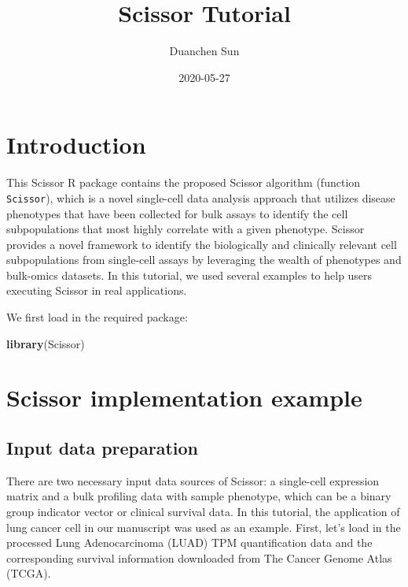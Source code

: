 \documentclass[]{article}
\title{Scissor Tutorial}
\author{Duanchen Sun}
\date{2020-05-27}
\newenvironment{Shaded}{\begin{snugshade}}{\end{snugshade}}
\newcommand{\KeywordTok}[1]{\textcolor[rgb]{0.13,0.29,0.53}{\textbf{#1}}}
\newcommand{\NormalTok}[1]{#1}
\begin{document}
\maketitle

{
\setcounter{tocdepth}{2}
\tableofcontents
}
\section{Introduction}\label{introduction}

This Scissor R package contains the proposed Scissor algorithm (function
\texttt{Scissor}), which is a novel single-cell data analysis approach
that utilizes disease phenotypes that have been collected for bulk
assays to identify the cell subpopulations that most highly correlate
with a given phenotype. Scissor provides a novel framework to identify
the biologically and clinically relevant cell subpopulations from
single-cell assays by leveraging the wealth of phenotypes and bulk-omics
datasets. In this tutorial, we used several examples to help users
executing Scissor in real applications.

We first load in the required package:

\begin{Shaded}
\begin{Highlighting}[]
\KeywordTok{library}\NormalTok{(Scissor)}
\end{Highlighting}
\end{Shaded}

\section{Scissor implementation
example}\label{scissor-implementation-example}

\subsection{Input data preparation}\label{input-data-preparation}

There are two necessary input data sources of Scissor: a single-cell
expression matrix and a bulk profiling data with sample phenotype, which
can be a binary group indicator vector or clinical survival data. In
this tutorial, the application of lung cancer cell in our manuscript was
used as an example. First, let's load in the processed Lung
Adenocarcinoma (LUAD) TPM quantification data and the corresponding
survival information downloaded from The Cancer Genome Atlas (TCGA).
\end{document}
